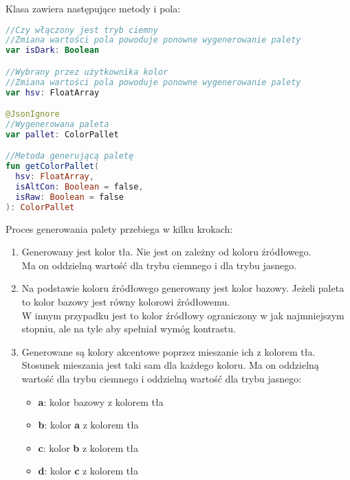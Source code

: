 \vspace{1em}

Klasa  zawiera następujące metody i pola:

\begin{lstlisting}[language=Kotlin]
//Czy włączony jest tryb ciemny
//Zmiana wartości pola powoduje ponowne wygenerowanie palety
var isDark: Boolean

//Wybrany przez użytkownika kolor
//Zmiana wartości pola powoduje ponowne wygenerowanie palety
var hsv: FloatArray

@JsonIgnore
//Wygenerowana paleta
var pallet: ColorPallet

//Metoda generującą paletę
fun getColorPallet(
  hsv: FloatArray,
  isAltCon: Boolean = false,
  isRaw: Boolean = false
): ColorPallet
\end{lstlisting}

\newpage

Proces generowania palety przebiega w kilku krokach:

\begin{enumerate}[leftmargin=*]
  \item Generowany jest kolor tła. Nie jest on zależny od koloru źródłowego.\\ Ma on oddzielną wartość dla trybu ciemnego i dla trybu jasnego.
  \item Na podstawie koloru źródłowego generowany jest kolor bazowy. Jeżeli paleta  to kolor bazowy jest równy kolorowi źródłowemu.\\
  W innym przypadku jest to kolor źródłowy ograniczony w jak najmniejszym stopniu, ale na tyle aby spełniał wymóg kontrastu.
  \item Generowane są kolory akcentowe poprzez mieszanie ich z kolorem tła. Stosunek mieszania jest taki sam dla każdego koloru. Ma on oddzielną wartość dla trybu ciemnego i oddzielną wartość dla trybu jasnego:
  \begin{itemize}[leftmargin=*]
    \item \textbf{a}: kolor bazowy z kolorem tła
    \item \textbf{b}: kolor \textbf{a} z kolorem tła
    \item \textbf{c}: kolor \textbf{b} z kolorem tła
    \item \textbf{d}: kolor \textbf{c} z kolorem tła
  \end{itemize}
\end{enumerate}

\newpage

